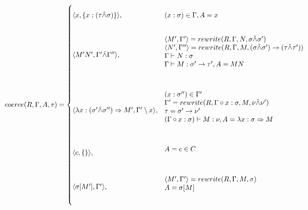\documentclass[main.tex]{subfiles}
\begin{document}
\[
coerce(R, \Gamma, A, \tau) =
\begin{cases*}
    \langle x, \{ x : (\tau \unify \sigma) \} \rangle,
    & \parbox{.6\textwidth}{\vspace{1em}
        $(x : \sigma) \in \Gamma, A = x$
        \vspace{1em}} \\
    \langle M'N', \Gamma' \unify \Gamma'' \rangle,
    & \parbox{.6\textwidth}{\vspace{1em}
        $\langle M', \Gamma' \rangle = rewrite(R, \Gamma, N, \sigma \unify \sigma')$ \\
        $\langle N', \Gamma'' \rangle = rewrite(R, \Gamma, M, (\sigma \unify \sigma') \tot (\tau \unify \tau'))$ \\
        $\Gamma \vdash N : \sigma$ \\
        $\Gamma \vdash M : \sigma' \tot \tau', A = MN$\\
        \vspace{1em}} \\
    \langle \lambda x : (\sigma' \unify \sigma'') \abstr M', \Gamma' \setminus x \rangle,
    & \parbox{.6\textwidth}{\vspace{1em}
        $(x : \sigma'') \in \Gamma'$ \\
        $\Gamma' = rewrite(R, \Gamma \circ x : \sigma, M, \nu \unify \nu')$ \\
        $\tau = \sigma' \tot \nu'$ \\
        $(\Gamma \circ x : \sigma) \vdash M : \nu, A = \lambda x : \sigma \abstr M$ \\
        \vspace{1em}} \\
    \langle c, \{ \} \rangle,
    & \parbox{.6\textwidth}{\vspace{1em}
        $A = c \in C$ \\
        \vspace{1em}} \\
    \langle \sigma[M'], \Gamma' \rangle,
    & \parbox{.6\textwidth}{\vspace{1em}
        $\langle M', \Gamma' \rangle = rewrite(R, \Gamma, M, \sigma)$ \\
        $A = \sigma[M]$ \\
        \vspace{1em}} \\
\end{cases*}
\]
\end{document}

